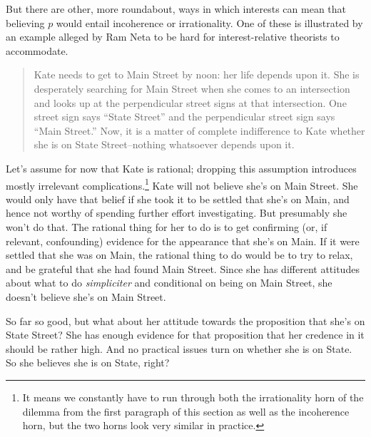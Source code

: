 \documentclass[oneside, a4paper]{book}
\begin{document}
But there are other, more roundabout, ways in which interests can mean that believing $p$ would entail incoherence or irrationality. One of these is illustrated by an example alleged by Ram Neta to be hard for interest-relative theorists to accommodate.

\begin{quote}
Kate needs to get to Main Street by noon: her life depends upon it. She is desperately searching for Main Street when she comes to an intersection and looks up at the perpendicular street signs at that intersection. One street sign says ``State Street'' and the perpendicular street sign says ``Main Street.'' Now, it is a matter of complete indifference to Kate whether she is on State Street--nothing whatsoever depends upon it. \citep[182]{Neta2007}
\end{quote}

\noindent Let's assume for now that Kate is rational; dropping this assumption introduces mostly irrelevant complications.\footnote{It means we constantly have to run through both the irrationality horn of the dilemma from the first paragraph of this section as well as the incoherence horn, but the two horns look very similar in practice.} Kate will not believe she's on Main Street. She would only have that belief if she took it to be settled that she's on Main, and hence not worthy of spending further effort investigating. But presumably she won't do that. The rational thing for her to do is to get confirming (or, if relevant, confounding) evidence for the appearance that she's on Main. If it were settled that she was on Main, the rational thing to do would be to try to relax, and be grateful that she had found Main Street. Since she has different attitudes about what to do \textit{simpliciter} and conditional on being on Main Street, she doesn't believe she's on Main Street.

So far so good, but what about her attitude towards the proposition that she's on State Street? She has enough evidence for that proposition that her credence in it should be rather high. And no practical issues turn on whether she is on State. So she believes she is on State, right?
\end{document}

